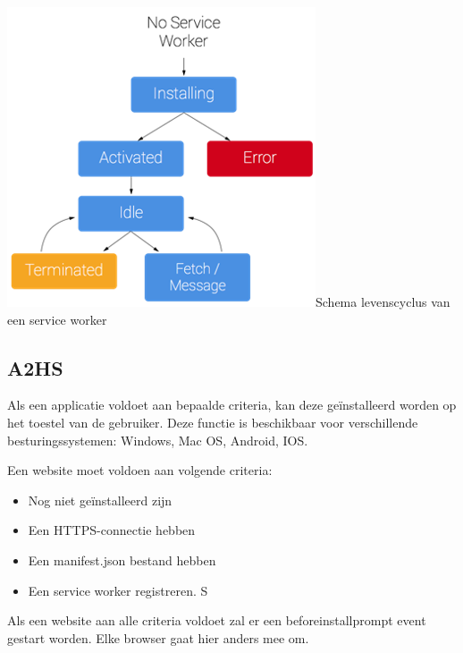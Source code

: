 \includegraphics{./img/ServiceWorkerLifeCycle.png}{Schema levenscyclus van een service worker \autocite{Gaunt2019}}




\subsection{A2HS}

Als een applicatie voldoet aan bepaalde criteria, kan deze geïnstalleerd worden op het toestel van de gebruiker. Deze functie is beschikbaar voor verschillende besturingssystemen: Windows, Mac OS, Android, IOS.

Een website moet voldoen aan volgende criteria:

\begin{itemize}
	\item	Nog niet geïnstalleerd zijn
	\item	Een HTTPS-connectie hebben
	\item	Een manifest.json bestand hebben
	\item	Een service worker registreren.
S
\end{itemize}

Als een website aan alle criteria voldoet zal er een beforeinstallprompt event gestart worden. Elke browser gaat hier anders mee om. 


